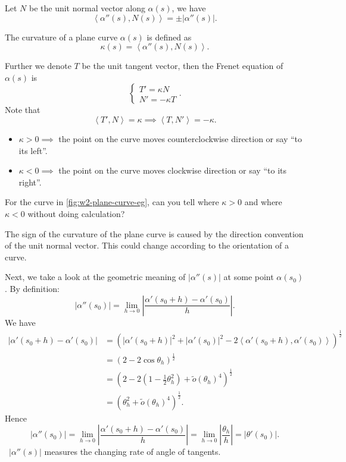Let \(N\) be the unit normal vector along \(\alpha(s)\), we have \[
    \left<\alpha''(s),N(s)\right> =\pm|\alpha''(s)|
.\] 
\begin{defn}
    The curvature of a plane curve \(\alpha(s)\) is defined as \[
        \kappa(s)=\left<\alpha''(s),N(s)\right>
    .\] 
\end{defn}
\begin{defn}
    Further we denote \(T\) be the unit tangent vector, then the Frenet equation
    of \(\alpha(s)\) is \[
        \begin{cases}
            T'=\kappa N \\
            N'=-\kappa T
        \end{cases}
    .\] Note that \[
        \left<T',N\right> =\kappa\implies \left<T,N'\right> =-\kappa
    .\] 
\end{defn}

\begin{itemize}
    \item \(\kappa>0\implies \) the point on the curve moves counterclockwise
        direction or say ``to its left''.
    \item \(\kappa<0\implies \) the point on the curve moves clockwise direction
        or say ``to its right''.
\end{itemize}

\begin{ques}
    For the curve in \cref{fig:w2-plane-curve-eg}, can you tell where \(\kappa>0\)
    and where \(\kappa<0\) without doing calculation?
\end{ques}

\begin{remark}
    The sign of the curvature of the plane curve is caused by the direction
    convention of the unit normal vector. This could change according to the
    orientation of a curve.
\end{remark}

Next, we take a look at the geometric meaning of \(|\alpha''(s)|\) at some point
\(\alpha(s_0)\). By definition: \[
    |\alpha''(s_0)|=\lim_{h \to 0} \left|\frac{\alpha'(s_0+h)-\alpha'(s_0)}{h}\right|
.\] 
We have
\begin{align*}
    |\alpha'(s_0+h)-\alpha'(s_0)|
    &= \left(|\alpha'(s_0+h)|^2+|\alpha'(s_0)|^2-2\left<\alpha'(s_0+h),
    \alpha'(s_0)\right> \right)^{\frac{1}{2}} \\
    &= (2-2\cos\theta_h)^{\frac{1}{2}} \\
    &= (2-2(1-\frac{1}{2}\theta_h^2)+\tilde{o}(\theta_h)^4)^{\frac{1}{2}} \\
    &= (\theta_h^2+\tilde{o}(\theta_h)^4)^{\frac{1}{2}}
.\end{align*}
Hence \[
    |\alpha''(s_0)|=\lim_{h \to 0} \left|\frac{\alpha'(s_0+h)-\alpha'(s_0)}{h}\right|
    =\lim_{h \to 0} \left|\frac{\theta_h}{h}\right|=|\theta'(s_0)|
.\] \ie\ \(|\alpha''(s)|\) measures the changing rate of angle of tangents.

